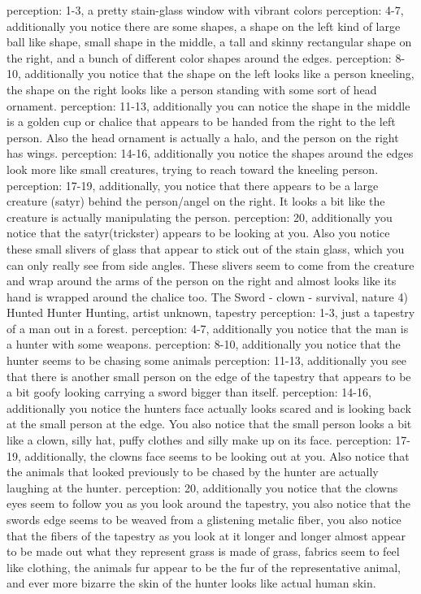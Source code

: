         perception: 1-3, a pretty stain-glass window with vibrant colors
        perception: 4-7, additionally you notice there are some shapes, a shape on the left kind of large ball like shape, small shape in the middle, a tall and skinny rectangular shape on the right, and a bunch of different color shapes around the edges.
        perception: 8-10, additionally you notice that the shape on the left looks like a person kneeling, the shape on the right looks like a person standing with some sort of head ornament.
        perception: 11-13, additionally you can notice the shape in the middle is a golden cup or chalice that appears to be handed from the right to the left person. Also the head ornament is actually a halo, and the person on the right has wings.
        perception: 14-16, additionally you notice the shapes around the edges look more like small creatures, trying to reach toward the kneeling person. 
        perception: 17-19, additionally, you notice that there appears to be a large creature (satyr) behind the person/angel on the right. It looks a bit like the creature is actually manipulating the person.
        perception: 20, additionally you notice that the satyr(trickster) appears to be looking at you. Also you notice these small slivers of glass that appear to stick out of the stain glass, which you can only really see from side angles. These slivers seem to come from the creature and wrap around the arms of the person on the right and almost looks like its hand is wrapped around the chalice too.         
    The Sword - clown - survival, nature
    4) Hunted Hunter Hunting, artist unknown, tapestry
        perception: 1-3, just a tapestry of a man out in a forest.
        perception: 4-7, additionally you notice that the man is a hunter with some weapons.
        perception: 8-10, additionally you notice that the hunter seems to be chasing some animals
        perception: 11-13, additionally you see that there is another small person on the edge of the tapestry that appears to be a bit goofy looking carrying a sword bigger than itself.
        perception: 14-16, additionally you notice the hunters face actually looks scared and is looking back at the small person at the edge. You also notice that the small person looks a bit like a clown, silly hat, puffy clothes and silly make up on its face.
        perception: 17-19, additionally, the clowns face seems to be looking out at you. Also notice that the animals that looked previously to be chased by the hunter are actually laughing at the hunter.
        perception: 20, additionally you notice that the clowns eyes seem to follow you as you look around the tapestry, you also notice that the swords edge seems to be weaved from a glistening metalic fiber, you also notice that the fibers of the tapestry as you look at it longer and longer almost appear to be made out what they represent grass is made of grass, fabrics seem to feel like clothing, the animals fur appear to be the fur of the representative animal, and ever more bizarre the skin of the hunter looks like actual human skin.
